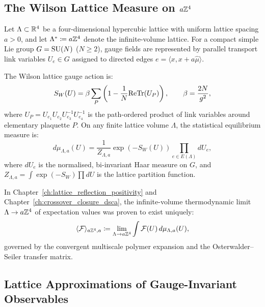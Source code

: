 \subsection{The Wilson Lattice Measure on \texorpdfstring{$a\mathbb{Z}^4$}{aZ4}}
\label{subsec:wilson_measure_lattice}

Let $\Lambda \subset \mathbb{R}^4$ be a four-dimensional hypercubic lattice with uniform lattice spacing $a > 0$, and let $\Lambda^* \coloneqq a\mathbb{Z}^4$ denote the infinite-volume lattice. For a compact simple Lie group $G = \mathrm{SU}(N)$ ($N \ge 2$), gauge fields are represented by parallel transport link variables $U_e \in G$ assigned to directed edges $e = \langle x, x + a \hat{\mu} \rangle$.

The Wilson lattice gauge action is:
\begin{equation}
\label{eq:wilson_lattice_action_ch16}
S_W(U) = \beta \sum_{P} \left( 1 - \frac{1}{N} \mathrm{Re} \mathrm{Tr}(U_P) \right), \qquad \beta = \frac{2N}{g^2},
\end{equation}
where $U_P = U_{e_1} U_{e_2} U_{e_3}^{-1} U_{e_4}^{-1}$ is the path-ordered product of link variables around elementary plaquette $P$. On any finite lattice volume $\Lambda$, the statistical equilibrium measure is:
\begin{equation}
\label{eq:finite_volume_measure}
d\mu_{\Lambda, a}(U) = \frac{1}{Z_{\Lambda, a}} \exp\left( -S_W(U) \right) \prod_{e \in E(\Lambda)} dU_e,
\end{equation}
where $dU_e$ is the normalised, bi-invariant Haar measure on $G$, and $Z_{\Lambda, a} = \int \exp(-S_W) \prod dU$ is the lattice partition function.

In Chapter~\ref{ch:lattice_reflection_positivity} and Chapter~\ref{ch:crossover_closure_dsca}, the infinite-volume thermodynamic limit $\Lambda \to a\mathbb{Z}^4$ of expectation values was proven to exist uniquely:
\begin{equation}
\langle \mathcal{F} \rangle_{a\mathbb{Z}^4, a} \coloneqq \lim_{\Lambda \to a\mathbb{Z}^4} \int \mathcal{F}(U) \, d\mu_{\Lambda, a}(U),
\end{equation}
governed by the convergent multiscale polymer expansion and the Osterwalder--Seiler transfer matrix.

\subsection{Lattice Approximations of Gauge-Invariant Observables}
\label{subsec:composite_lattice_observables}


